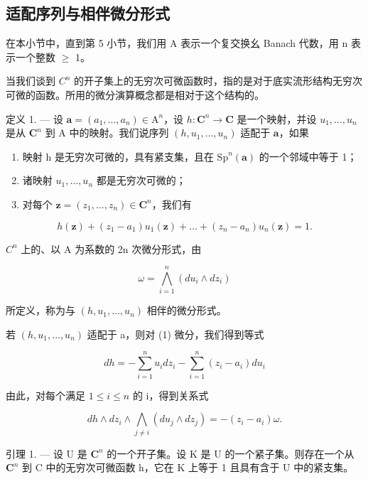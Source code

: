 \subsection{适配序列与相伴微分形式}

在本小节中，直到第 5 小节，我们用 A 表示一个复交换幺 Banach 代数，用 n 表示一个整数 \(\geqslant\) 1。

当我们谈到 \(C^{n}\) 的开子集上的无穷次可微函数时，指的是对于底实流形结构无穷次可微的函数。所用的微分演算概念都是相对于这个结构的。

定义 1. --- 设 \(\boldsymbol{a} = (a_{1},\ldots ,a_{n})\in \mathrm{A}^{n}\)，设 \(h\colon \mathbf{C}^n\to \mathbf{C}\) 是一个映射，并设 \(u_{1},\ldots ,u_{n}\) 是从 \(\mathbf{C}^n\) 到 A 中的映射。我们说序列 \((h,u_1,\dots ,u_n)\) 适配于 \(\boldsymbol{a}\)，如果

\begin{enumerate}
\def\labelenumi{(\roman{enumi})}
\item
  映射 h 是无穷次可微的，具有紧支集，且在 \(\mathrm{Sp}^n (\boldsymbol {a})\) 的一个邻域中等于 1；
\item
  诸映射 \(u_1, \ldots, u_n\) 都是无穷次可微的；
\item
  对每个 \(\boldsymbol{z} = (z_{1},\dots ,z_{n})\in \mathbf{C}^{n}\)，我们有
\end{enumerate}

\[
h (\boldsymbol {z}) + (z _ {1} - a _ {1}) u _ {1} (\boldsymbol {z}) + \dots + (z _ {n} - a _ {n}) u _ {n} (\boldsymbol {z}) = 1.\tag{1}
\]

\(C^{n}\) 上的、以 A 为系数的 2n 次微分形式，由

\[
\omega = \bigwedge_ {i = 1} ^ {n} (d u _ {i} \wedge d z _ {i})
\]

所定义，称为与 \((h, u_1, \ldots, u_n)\) 相伴的微分形式。

若 \((h, u_{1}, \ldots, u_{n})\) 适配于 a，则对 (1) 微分，我们得到等式

\[
d h = - \sum_ {i = 1} ^ {n} u _ {i} d z _ {i} - \sum_ {i = 1} ^ {n} (z _ {i} - a _ {i}) d u _ {i}\tag{2}
\]

由此，对每个满足 \(1 \leqslant i \leqslant n\) 的 i，得到关系式

\[
d h \wedge d z _ {i} \wedge \bigwedge_ {j \neq i} (d u _ {j} \wedge d z _ {j}) = - (z _ {i} - a _ {i}) \omega .\tag{3}
\]

引理 1. --- 设 U 是 \(\mathbf{C}^{n}\) 的一个开子集。设 K 是 U 的一个紧子集。则存在一个从 \(\mathbf{C}^{n}\) 到 C 中的无穷次可微函数 h，它在 K 上等于 1 且具有含于 U 中的紧支集。

